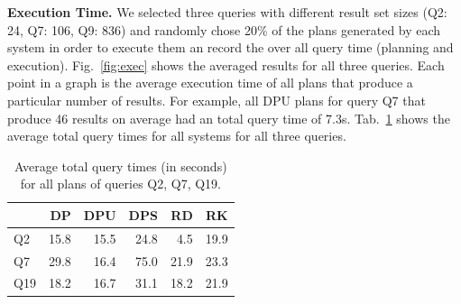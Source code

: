 \textbf{Execution Time.} We selected three queries with different
result set sizes (Q2: 24, Q7: 106, Q9: 836) and randomly chose 20\% of
the plans generated by each system in order to execute them an record
the over all query time (planning and execution). Fig.~\ref{fig:exec}
shows the averaged results for all three queries. Each point in a
graph is the average execution time of all plans that produce a
particular number of results. For example, all DPU plans for query Q7
that produce 46 results on average had an total query time of
7.3s. Tab.~\ref{tab:exectimes} shows the average total query times for
all systems for all three queries.





\begin{table}[htb]
  \centering
  \begin{tabular}{l|r|r|r|r|r}
        & DP   & DPU  & DPS  & RD   & RK   \\
    \hline
    Q2  & 15.8 & 15.5 & 24.8 & 4.5  & 19.9 \\
    Q7  & 29.8 & 16.4 & 75.0 & 21.9 & 23.3 \\
    Q19 & 18.2 & 16.7 & 31.1 & 18.2 & 21.9 \\
  \end{tabular}
  \caption{Average total query times (in seconds) for all plans of queries Q2, Q7, Q19.}
  \label{tab:exectimes}
\end{table}

